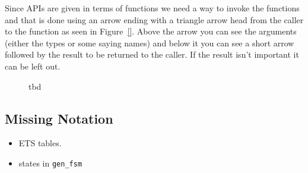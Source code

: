 \documentclass[a4paper, pdftex]{tufte-handout}
\begin{document}
Since APIs are given in terms of functions we need a way to invoke the functions and
that is done using an arrow ending with a triangle arrow head from the caller to the
function as seen in Figure~\ref{}. Above the arrow you can see the arguments
(either the types or some saying names) and below it you can see a short arrow
followed by the result to be returned to the caller. If the result isn't important it
can be left out.

\begin{figure}[h]
  \centering
  \caption{tbd}
  \label{fig:ve-invoke-function}
\end{figure}

\subsection{Missing Notation}
\label{sec:missing-notation}

\begin{itemize}
\item ETS tables.
\item states in \verb|gen_fsm|   
\end{itemize}
\end{document}
